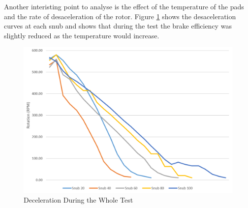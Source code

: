		Another interisting point to analyse is the effect of the temperature of the pads and the rate of desaceleration of the rotor. Figure \ref{fig:snubs-rotation} shows the desaceleration curves at each snub and shows that during the test the brake efficiency was slightly reduced as the temperature would increase.

		\begin{figure}[htbp]
				\centering
				\includegraphics[width=.8\textwidth]{figuras/fig-snubs-rotation}
				\caption{Deceleration During the Whole Test}
				\label{fig:snubs-rotation}
		\end{figure}